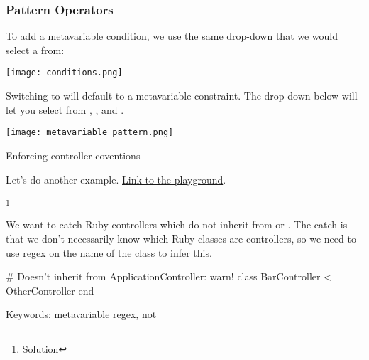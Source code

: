 \documentclass[aspectratio=169, handout]{beamer}
\newenvironment{exercisePage}[1]{
  \begin{minipage}[t][0.4in][t]{\textwidth}
    \Large \term{Exercise:} #1
  \end{minipage}
  \begin{minipage}[t][2.6in][t]{\textwidth}
}{
  \end{minipage}
}
\newcommand\blfootnote[1]{
    \begingroup
    \renewcommand\thefootnote{}\footnote{#1}
    \addtocounter{footnote}{-1}
    \endgroup
}
\newcommand\solutionLink[1]{
  \blfootnote{\color{blue}\href{#1}{Solution}}
}
\newcommand\patternNotLink[1][]{{\color{blue}\href{https://semgrep.dev/docs/writing-rules/rule-syntax\#pattern-not}{not}}}
\newcommand\metavariableRegexLink[1][]{{\color{blue}\href{https://semgrep.dev/docs/writing-rules/rule-syntax\#metavariable-regex}{metavariable regex}}}
\begin{document}
\begin{frame}[fragile]
  \frametitle{Pattern Operators}

  To add a metavariable condition, we use the same drop-down that we would
  select a  from:

  \vspace{\fill}

  \begin{center}
    \texttt{[image: conditions.png]}
  \end{center}

  \vspace{\fill}

  Switching to  will default to a metavariable 
  constraint. The drop-down below will let you select from ,
  , and .

  \vspace{\fill}

  \begin{center}
    \texttt{[image: metavariable\_pattern.png]}
  \end{center}
\end{frame}

\begin{frame}[fragile]
  \begin{exercisePage}{Enforcing controller coventions}

  Let's do another example. {\color{blue}\href{https://semgrep.dev/playground/r/YGUpKG9/semgrep.ruby-inherit-appcontroller-fix-annotations}{Link to the playground}}.
  \solutionLink{https://semgrep.dev/playground/r/zdUK0g2/semgrep.ruby-inherit-appcontroller-solution}

  \vspace{\fill}

  We want to catch Ruby controllers which do not inherit from 
  or . The catch is that we don't necessarily know which
  Ruby classes are controllers, so we need to use regex on the name of the class to
  infer this.

  \vspace{\fill}

  \begin{codeblock}[language=ruby]
    # Doesn't inherit from ApplicationController: warn!
    class BarController < OtherController
    end
  \end{codeblock}

  \vspace{\fill}

  Keywords: \metavariableRegexLink, \patternNotLink
  \end{exercisePage}
\end{frame}
\end{document}
